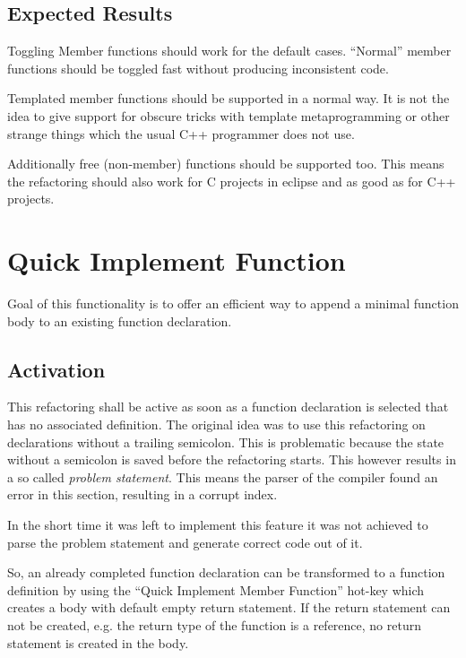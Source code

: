 \subsection{Expected Results}

Toggling Member functions should work for the default cases. ``Normal'' member
functions should be toggled fast without producing inconsistent code. 

Templated member functions should be supported in a normal way. It is not the
idea to give support for obscure tricks with template metaprogramming or other
strange things which the usual C++ programmer does not use. 

Additionally free (non-member) functions should be supported too. This means the
refactoring should also work for C projects in eclipse and as good as for C++
projects.

\section{Quick Implement Function}

Goal of this functionality is to offer an efficient way to append a minimal
function body to an existing function declaration.

\subsection{Activation}
This refactoring shall be active as soon as a function declaration is selected 
that has no associated definition. The original idea was to use this
refactoring on declarations without a trailing semicolon. This is problematic
because the state without a semicolon is saved before the refactoring starts.
This however results in a so called \textit{problem statement}. This means the
parser of the compiler found an error in this section, resulting in a corrupt
index.\newline

In the short time it was left to implement this feature it was not achieved to
parse the problem statement and generate correct code out of it.\newline 

So, an already completed function declaration can be transformed to a function
definition by using the ``Quick Implement Member Function'' hot-key which
creates a body with default empty return statement. If the return statement can
not be created, e.g. the return type of the function is a reference, no return
statement is created in the body.

